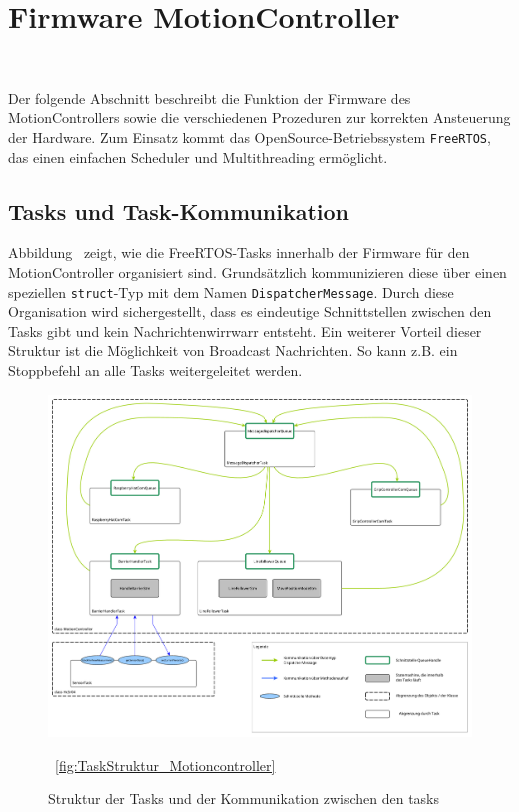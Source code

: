 \documentclass[main.tex]{subfiles} %
\begin{document}
\section{Firmware MotionController}~\label{apdx:FirmwareMotionController}

Der folgende Abschnitt beschreibt die Funktion der Firmware des
MotionControllers sowie die verschiedenen Prozeduren zur korrekten Ansteuerung
der Hardware. Zum Einsatz kommt das OpenSource-Betriebssystem
\texttt{FreeRTOS}, das einen einfachen Scheduler und Multithreading ermöglicht.

\subsection{Tasks und Task-Kommunikation}

Abbildung~\label{fig:TaskStruktur_MotionController} zeigt, wie die
FreeRTOS-Tasks innerhalb der Firmware für den MotionController organisiert
sind. Grundsätzlich kommunizieren diese über einen speziellen
\texttt{struct}-Typ mit dem Namen \texttt{DispatcherMessage}. Durch diese
Organisation wird sichergestellt, dass es eindeutige Schnittstellen zwischen
den Tasks gibt und kein Nachrichtenwirrwarr entsteht. Ein weiterer Vorteil
dieser Struktur ist die Möglichkeit von Broadcast Nachrichten. So kann z.B. ein
Stoppbefehl an alle Tasks weitergeleitet werden.

\begin{figure}[H]
    \centering
    \includegraphics[width=1\linewidth]{./fig_Firmware_MotionController/TaskStruktur.pdf}
    \caption{Struktur der Tasks und der Kommunikation zwischen den tasks}~\ref{fig:TaskStruktur_Motioncontroller}
\end{figure}
\end{document}
